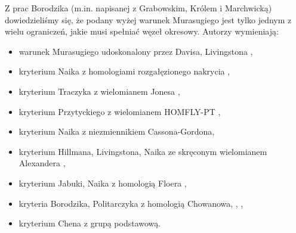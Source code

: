 Z prac Borodzika (m.in. \cite{grabowski20} napisanej z Grabowskim, Królem i Marchwicką) dowiedzieliśmy się, że podany wyżej warunek Murasugiego jest tylko jednym z wielu ograniczeń, jakie musi spełniać węzeł okresowy.
Autorzy wymieniają:
\begin{itemize}
    \item warunek Murasugiego udoskonalony przez Davisa, Livingstona \cite{davis1991},
    \item kryterium Naika z homologiami rozgałęzionego nakrycia \cite{naik1997},
    \item kryterium Traczyka z wielomianem Jonesa \cite{traczyk1991},
    \item kryterium Przytyckiego z wielomianem HOMFLY-PT \cite{przytyckij1989},
    \item kryterium Naika z niezmiennikiem Cassona-Gordona,
    \item kryterium Hillmana, Livingstona, Naika ze skręconym wielomianem Alexandera \cite{hillman2006},
    \item kryterium Jabuki, Naika z homologią Floera \cite{jabuka2016},
    \item kryteria Borodzika, Politarczyka z homologią Chowanowa, \cite{politarczyk2017}, \cite{politarczyk2021},
    \item kryterium Chena z grupą podstawową.
\end{itemize}
%

%


